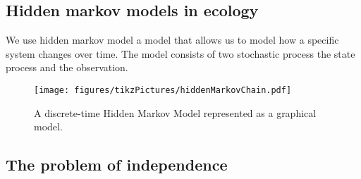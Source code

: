\subsection*{Hidden markov models in ecology}
We use hidden markov model a model that allows us to model how a specific system changes over time. The model consists of two stochastic process the state process and the observation.
\begin{figure}[h]
    \centering
    \texttt{[image: figures/tikzPictures/hiddenMarkovChain.pdf]}
    \caption{A discrete-time Hidden Markov Model represented as a graphical model.}
\end{figure}
\subsection*{The problem of independence}